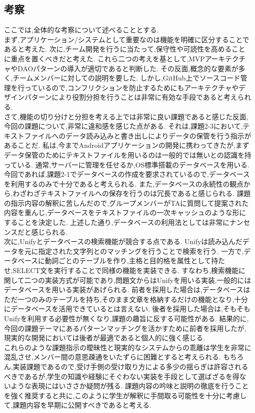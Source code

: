 \documentclass[uplatex,12pt]{jsarticle}
\begin{document}
\subsection{考察}
ここでは,全体的な考察について述べることとする. \\
まず,アプリケーション/システムとして重要なのは機能を明確に区分することであると考えた.
次に,チーム開発を行うに当たって,保守性や可読性を高めることに重点を置くべきだと考えた.
これら二つの考えを基として,MVPアーキテクチャやDAOパターンの導入が適切であると判断した.
その反面,概念的な要素が多く,チームメンバーに対しての説明を要した.
しかし,GitHub上でソースコード管理を行っているので,コンフリクションを防止するためにもアーキテクチャやデザインパターンにより役割分担を行うことは非常に有効な手段であると考えられる. \\

さて,機能の切り分けと分担を考える上では非常に良い課題であると感じた反面,今回の課題について,非常に違和感を感じた点がある.
それは,課題2-3において,テキストファイルへのデータ読み込みと書き出しによりデータの保管を行う指示があることだ.
私は,今までAndroidアプリケーションの開発に携わってきたが,まずデータ保管のためにテキストファイルを用いるのは一般的では無いとの認識を持っている.
通常,サーバーに管理を任せるか,OS標準搭載のデータベースを用いる.
今回であれば,課題2-1でデータベースの作成を要求されているので,データベースを利用するのみで十分であると考えられる.
また,データベースの永続性の観点から,わざわざテキストファイルへの保存を行うのは冗長であると感じられる.
課題の指示内容の解釈に苦しんだので,グループメンバーがTAに質問して提案された内容を重んじ,データベースをテキストファイルの一次キャッシュのような形にすることを決定した.
上述した通り,データベースの利用法としては非常にナンセンスだと感じられる. \\
次に,Unifyとデータベースの検索機能が競合する点である.
Unifyは読み込んだデータを元に指定された文字列とのマッチングを行うことで検索を行う.
一方で,データベースに動詞ごとのテーブルを作り,主格と目的格を属性として持たせ,SELECT文を実行することで同様の機能を実装できる.
すなわち,検索機能に関して二つの実装方式が可能であり,問題文からはUnifyを用いる実装,一般的にはデータベースを用いる実装があげられる.
前者を採用した場合は,データベースはただ一つのみのテーブルを持ち,そのまま文章を格納するだけの機能となり,十分にデータベースを活用できているとは言えない.
後者を採用した場合は,そもそもUnifyを利用する必要性が無くなり,課題の趣旨に反する可能性がある.
結果的に,今回の課題テーマにあるパターンマッチングを活かすために前者を採用したが,現実的な開発においては後者が最適であると個人的に強く感じる. \\
これらのような課題指示の曖昧性と現実的なシステムからの乖離は学生を非常に混乱させ,メンバー間の意思疎通をいたずらに困難とすると考えられる.
もちろん,実装課題であるので,受け手側の受け取り方による多少の揺らぎは許容されるべきであるが,学生の知識や経験にそぐわない実装を手段として選ばざるを得ないような表現にはいささか疑問が残る.
課題内容の吟味と説明の徹底を行うことを強く推奨すると共に,このように学生が解釈に手間取る可能性を十分に考慮して,課題内容を早期に公開すべきであると考える.
\end{document}
